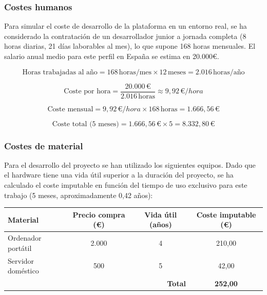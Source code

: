 \subsubsection{Costes humanos}

Para simular el coste de desarrollo de la plataforma en un entorno real, se ha considerado la contratación de un desarrollador junior a jornada completa (8 horas diarias, 21 días laborables al mes), lo que supone 168 horas mensuales. El salario anual medio para este perfil en España se estima en 20.000€.

\begin{equation*}
\text{Horas trabajadas al año} = 168\,\text{horas/mes} \times 12\,\text{meses} = 2.016\,\text{horas/año}
\end{equation*}

\begin{equation*}
\text{Coste por hora} = \frac{20.000\,€}{2.016\,\text{horas}} \approx 9,92\,€/hora
\end{equation*}

\begin{equation*}
\text{Coste mensual} = 9,92\,€/hora \times 168\,\text{horas} = 1.666,56\,€
\end{equation*}

\begin{equation*}
\text{Coste total (5 meses)} = 1.666,56\,€ \times 5 = 8.332,80\,€
\end{equation*}

\subsubsection{Costes de material}

Para el desarrollo del proyecto se han utilizado los siguientes equipos. Dado que el hardware tiene una vida útil superior a la duración del proyecto, se ha calculado el coste imputable en función del tiempo de uso exclusivo para este trabajo (5 meses, aproximadamente 0,42 años):

\begin{center}
\begin{tabular}{|l|c|c|c|}
\hline
\textbf{Material} & \textbf{Precio compra (€)} & \textbf{Vida útil (años)} & \textbf{Coste imputable (€)} \\
\hline
Ordenador portátil & 2.000 & 4 & 210,00 \\
Servidor doméstico & 500 & 5 & 42,00 \\
\hline
\multicolumn{3}{|r|}{\textbf{Total}} & \textbf{252,00} \\
\hline
\end{tabular}
\end{center}

